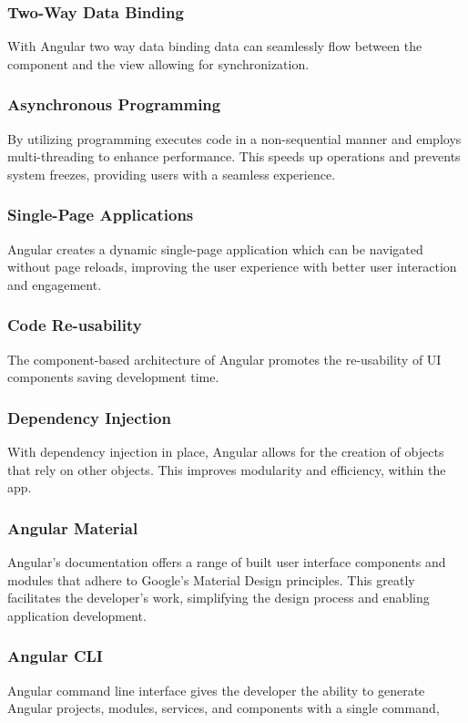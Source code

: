 \subsubsection{Two-Way Data Binding}
With Angular two way data binding data can seamlessly flow between the component and the view allowing for synchronization.

\subsubsection{Asynchronous Programming}
By utilizing programming executes code in a non-sequential manner and employs multi-threading to enhance performance. This speeds up operations and prevents system freezes, providing users with a seamless experience.

\subsubsection{Single-Page Applications}
Angular creates a dynamic single-page application which can be navigated without page reloads, improving the user experience with better user interaction and engagement.

\subsubsection {Code Re-usability}
The component-based architecture of Angular promotes the re-usability of UI components saving development time.

\subsubsection{Dependency Injection}
With dependency injection in place, Angular allows for the creation of objects that rely on other objects. This improves modularity and efficiency, within the app.

\subsubsection{Angular Material}
Angular's documentation offers a range of built user interface components and modules that adhere to Google's Material Design principles. This greatly facilitates the developer's work, simplifying the design process and enabling application development.

\subsubsection{Angular CLI} Angular command line interface gives the developer the ability to generate Angular projects, modules, services, and components with a single command, 

